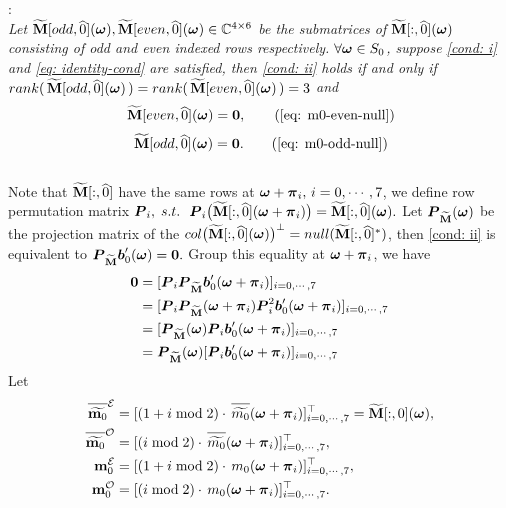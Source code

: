 :\\[.2em]
{\it Let $\widetilde{\mathbf{M}}[odd,\widehat{0}](\boldsymbol{\omega}),\widetilde{\mathbf{M}}[even,\widehat{0}](\boldsymbol{\omega})\in\mathbb{C}^{4\times6}$ be the submatrices of $\widetilde{\mathbf{M}}[:,\widehat{0}](\boldsymbol{\omega})$ consisting of odd and even indexed rows respectively. $\forall\boldsymbol{\omega}\in S_0$, suppose {\rm\ref{cond: i}} and \eqref{eq: identity-cond} are satisfied, then {\rm\ref{cond: ii}} holds if and only if $rank(\,\widetilde{\mathbf{M}}[odd,\widehat{0}](\boldsymbol{\omega})\,) = rank(\,\widetilde{\mathbf{M}}[even,\widehat{0}](\boldsymbol{\omega})\,) = 3$ and 
\begin{align}%
[m_0(\V{\omega}),m_0(\V{\omega}+\V{\pi}_2), m_0(\V{\omega} +\V{\pi}_4), m_0(\V{\omega}+\V{\pi}_6)]\, \M[even,\widehat{0}](\V{\omega}) = \V{0}, \tag{\ref{eq: m0-even-null}}
\end{align}
\begin{align}%
[m_0(\V{\omega}+\V{\pi}_1),m_0(\V{\omega}+\V{\pi}_3), m_0(\V{\omega} +\V{\pi}_5), m_0(\V{\omega}+\V{\pi}_7)] \,\M[odd,\widehat{0}](\V{\omega}) = \V{0}. \tag{\ref{eq: m0-odd-null}}
\end{align}
}
\\[.5em]
Note that $\widetilde{\mathbf{M}}[:,\widehat{0}]$ have the same rows at $\boldsymbol{\omega} + \boldsymbol{\pi}_i,\,i = 0,\cdots,7$, we define row permutation matrix $\boldsymbol{P}_i,\; s.t.\,$ $\boldsymbol{P}_i\big(\widetilde{\mathbf{M}}[:,\widehat{0}](\boldsymbol{\omega} + \boldsymbol{\pi}_i)\big) = \widetilde{\mathbf{M}}[:,\widehat{0}](\boldsymbol{\omega}). $ Let $\boldsymbol{P}_{\widetilde{\mathbf{M}}}(\boldsymbol{\omega})$ be the projection matrix of the $col\big(\widetilde{\mathbf{M}}[:,\widehat{0}](\boldsymbol{\omega})\big)^\bot = null(\widetilde{\mathbf{M}}[:,\widehat{0}]^*)$, then \ref{cond: ii} is equivalent to $\boldsymbol{P}_{\widetilde{\mathbf{M}}}\boldsymbol{b}_0'(\boldsymbol{\omega}) = \boldsymbol{0}.$ Group this equality at $\boldsymbol{\omega}+\boldsymbol{\pi}_i$, we have 
\begin{align}\label{eq: group-proj}
\boldsymbol{0} & = [\boldsymbol{P}_i\boldsymbol{P}_{\widetilde{\mathbf{M}}}\boldsymbol{b}_0'(\boldsymbol{\omega} + \boldsymbol{\pi}_i) ]_{i=0,\cdots,7}\notag\\
&= [\boldsymbol{P}_i\boldsymbol{P}_{\widetilde{\mathbf{M}}}(\boldsymbol{\omega}+\boldsymbol{\pi}_i)\boldsymbol{P}_i^2\boldsymbol{b}_0'(\boldsymbol{\omega}+\boldsymbol{\pi}_i) ]_{i = 0,\cdots,7}\notag\\
&= [\boldsymbol{P}_{\widetilde{\mathbf{M}}}(\boldsymbol{\omega})\boldsymbol{P}_i\boldsymbol{b}_0'(\boldsymbol{\omega}+\boldsymbol{\pi}_i)]_{i = 0,\cdots,7}\notag\\
&= \boldsymbol{P}_{\widetilde{\mathbf{M}}}(\boldsymbol{\omega})[\boldsymbol{P}_i\boldsymbol{b}_0'(\boldsymbol{\omega}+\boldsymbol{\pi}_i)]_{i = 0,\cdots,7}
\end{align}
Let 
\begin{align*}
\mteven&= [ (1 + i \bmod 2)\cdot\,\sbarmp{0}{i}]_{i=0,\cdots,7}^\top = \M[:,0](\V{\omega}),\\
\mtodd&= [ (i \bmod 2)\cdot\,\sbarmp{0}{i}]_{i=0,\cdots,7}^\top,\\
\meven&= [ (1 + i \bmod 2)\cdot\,m_0(\V{\omega} + \V{\pi}_i)]_{i=0,\cdots,7}^\top,\\
\modd&= [ ( i \bmod 2)\cdot\,m_0(\V{\omega} + \V{\pi}_i)]_{i=0,\cdots,7}^\top.
\end{align*}
